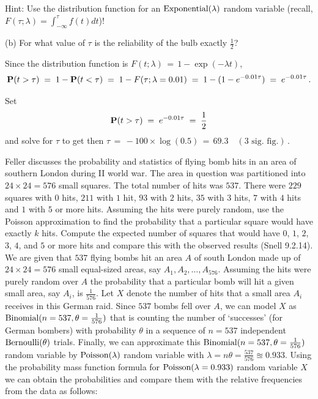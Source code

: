 \begin{ExerciseList}
Hint: Use the distribution function for an $\mbox{{\rm Exponential}}(\lambda)$ random variable (recall, $F(\tau;\lambda)=\int_{-\infty}^{\tau} f(t) dt$)!

\item[(b)]For what  value of $\tau$ is the reliability of the bulb exactly $\frac{1}{2}$?
\ee
\Answer
\be
\item Since the distribution function is $F(t; \lambda) \,=\,
  1 - \exp( - \lambda t)$,
 \[\mathbf{P}(t>\tau)\;=\;1-\mathbf{P}(t<\tau)\;=\; 1 - F(\tau;\lambda=0.01) \;=\;1-(1-e^{-0.01\tau})\;=\;e^{-0.01\tau}\,.\]

\item Set  \[\mathbf{P}(t>\tau)\;=\;e^{-0.01\tau}\;=\;\frac{1}{2}\]
and solve for $\tau$ to get  then $\tau\,=\,-100\times \log(0.5)\,=\,69.3\quad (\text{3 sig. fig.})$\,.
\ee

\Exercise
Feller discusses the probability and statistics of flying bomb hits in an area of southern London during II world war.  
The area in question was partitioned into $24 \times 24 = 576$ small squares.  
The total number of hits was $537$.  
There were $229$ squares with $0$ hits, $211$ with $1$ hit, $93$ with $2$ hits, $35$ with $3$ hits, $7$ with $4$ hits and $1$ with $5$ or more hits.  
Assuming the hits were purely random, use the Poisson approximation to find the probability that a particular square would have exactly $k$ hits.  Compute the expected number of squares that would have $0$, $1$, $2$, $3$, $4$, and $5$ or more hits and compare this with the observed results (Snell 9.2.14).  
\Answer
We are given that $537$ flying bombs hit an area $A$ of south London made up of $24 \times 24=576$ small equal-sized areas, say $A_1,A_2,\ldots,A_{576}$.  
Assuming the hits were purely random over $A$ the probability that a particular bomb will hit a given small area, say $A_i$, is $\frac{1}{576}$.  
Let $X$ denote the number of hits that a small area $A_i$ receives in this German raid.  
Since $537$ bombs fell over $A$, we can model $X$ as $\mbox{{\rm Binomial}}(n=537,\theta=\frac{1}{576})$ that is counting the number of `successes' (for German bombers) with probability $\theta$ in a sequence of $n=537$ independent $\mbox{{\rm Bernoulli}}(\theta)$ trials.  
Finally, we can approximate this $\mbox{{\rm Binomial}}(n=537,\theta=\frac{1}{576})$ random variable by $\mbox{{\rm Poisson}}(\lambda)$ random variable with $\lambda=n\theta=\frac{537}{576} \approxeq 0.933$.
Using the probability mass function formula for $\mbox{{\rm Poisson}}(\lambda=0.933)$ random variable $X$ we can obtain the probabilities and compare them with the relative frequencies from the data as follows:


\end{ExerciseList}

